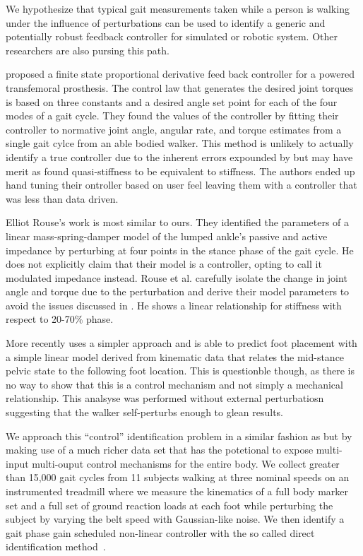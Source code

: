 \documentclass{article}
\begin{document}
We hypothesize that typical gait measurements taken while a person is walking
under the influence of perturbations can be used to identify a generic and
potentially robust feedback controller for simulated or robotic system. Other
researchers are also pursing this path.

\cite{Sup2008} proposed a finite state proportional derivative feed back
controller for a powered transfemoral prosthesis. The control law that
generates the desired joint torques is based on three constants and a desired
angle set point for each of the four modes of a gait cycle. They found the
values of the controller by fitting their controller to normative joint angle,
angular rate, and torque estimates from a single gait cylce from an able bodied
walker. This method is unlikely to actually identify a true controller due
to the inherent errors expounded by \cite{Rouse2013} but may have merit as
\cite{Rouse2014} found quasi-stiffness to be equivalent to stiffness. The
authors ended up hand tuning their ontroller based on user feel leaving them
with a controller that was less than data driven.


Elliot Rouse's \cite{Rousse2014} work is most similar to ours. They identified
the parameters of a linear mass-spring-damper model of the lumped ankle's
passive and active impedance by perturbing at four points in the stance phase of the gait
cycle. He does not explicitly claim that their model is a controller, opting
to call it modulated impedance instead. Rouse et al. carefully isolate the
change in joint angle and torque due to the perturbation and derive their model
parameters to avoid the issues discussed in \cite{Rouse2013}. He shows a linear
relationship for stiffness with respect to 20-70\% phase.

More recently \cite{Wang2014} uses a simpler approach and is able to predict
foot placement with a simple linear model derived from kinematic data that
relates the mid-stance pelvic state to the following foot location. This is
questionble though, as there is no way to show that this is a control mechanism
and not simply a mechanical relationship. This analsyse was performed without
external perturbatiosn suggesting that the walker self-perturbs enough to glean
results.

We approach this ``control'' identification problem in a similar fashion as
\cite{Rouse2014} but by making use of a much richer data set that has the
potetional to expose multi-input multi-ouput control mechanisms for the entire
body. We collect greater than 15,000 gait cycles from 11 subjects walking at
three nominal speeds on an instrumented treadmill where we measure the
kinematics of a full body marker set and a full set of ground reaction loads at
each foot while perturbing the subject by varying the belt speed with
Gaussian-like noise. We then identify a gait phase gain scheduled non-linear
controller with the so called direct identification method~\cite{Ljung1999}.
\end{document}
